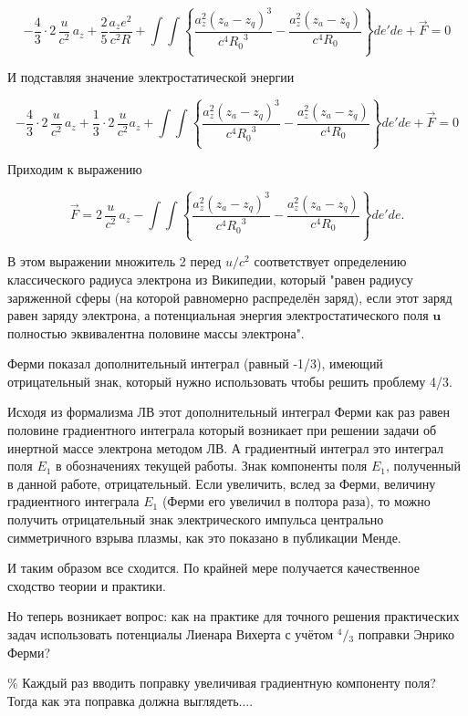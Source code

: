 \documentclass[11pt]{article}
\begin{document}
\[-\frac{4}{3}\cdot 2 \,\frac{u}{c^2} \, a_z + \frac{2}{5} \frac{a_z e^2}{c^2{R}} + \int \int \left\{
\frac{a_z^2\left( {{z}_{a}}-{{z}_{q}} \right)^3}{c^4{{{R}_{0}}^3}}  -\frac{{a_z^2}\left(z_a-z_q\right)}{{{c}^{4}}{{{R}_{0}}}}
 \right\}
de' de + \vec F = 0\]

И подставляя значение электростатической энергии

\[-\frac{4}{3}\cdot 2 \,\frac{u}{c^2} \, a_z + \frac{1}{3} \cdot 2 \, \frac{u}{c^2} a_z + \int \int \left\{
\frac{a_z^2\left( {{z}_{a}}-{{z}_{q}} \right)^3}{c^4{{{R}_{0}}^3}}  -\frac{{a_z^2}\left(z_a-z_q\right)}{{{c}^{4}}{{{R}_{0}}}}
 \right\}
de' de + \vec F = 0\]

    Приходим к выражению

\[\vec F =  2 \,\frac{u}{c^2} \, a_z - \int \int \left\{
\frac{a_z^2\left( {{z}_{a}}-{{z}_{q}} \right)^3}{c^4{{{R}_{0}}^3}}  -\frac{{a_z^2}\left(z_a-z_q\right)}{{{c}^{4}}{{{R}_{0}}}}
 \right\} de' de.\]

    В этом выражении множитель 2 перед \({u}/{c^2}\) соответствует
определению классического радиуса электрона из Википедии, который "равен
радиусу заряженной сферы (на которой равномерно распределён заряд), если
этот заряд равен заряду электрона, а потенциальная энергия
электростатического поля \(\textbf{u}\) полностью эквивалентна половине
массы электрона".

    Ферми показал дополнительный интеграл (равный -1/3), имеющий
отрицательный знак, который нужно использовать чтобы решить проблему
4/3.

Исходя из формализма ЛВ этот дополнительный интеграл Ферми как раз равен
половине градиентного интеграла который возникает при решении задачи об
инертной массе электрона методом ЛВ. А градиентный интеграл это интеграл
поля \(E_1\) в обозначениях текущей работы. Знак компоненты поля
\(E_1\), полученный в данной работе, отрицательный. Если увеличить,
вслед за Ферми, величину градиентного интеграла \(E_1\) (Ферми его
увеличил в полтора раза), то можно получить отрицательный знак
электрического импульса центрально симметричного взрыва плазмы, как это
показано в публикации Менде.

И таким образом все сходится. По крайней мере получается качественное
сходство теории и практики.

Но теперь возникает вопрос: как на практике для точного решения
практических задач использовать потенциалы Лиенара Вихерта с учётом
\({}^{4}/{}_{3}\) поправки Энрико Ферми?

\% Каждый раз вводить поправку увеличивая градиентную компоненту поля?
Тогда как эта поправка должна выглядеть....
\end{document}
